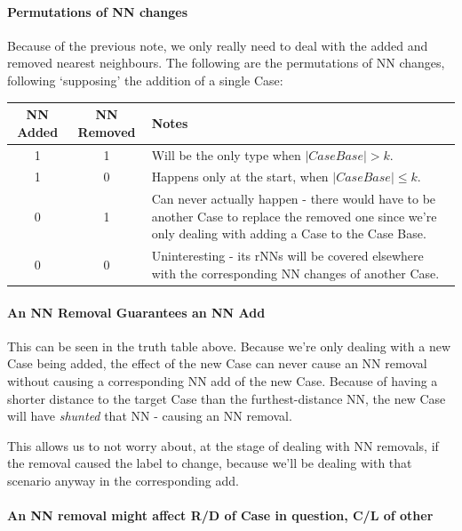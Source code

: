 \documentclass[a4paper,11pt]{report}
\begin{document}
\begin{samepage}
\paragraph{Permutations of NN changes}
Because of the previous note, we only really need to deal with the added and removed nearest neighbours. The following are the permutations of NN changes, following `supposing' the addition of a single Case:

\vspace{10pt}

\begin{tabular}{ | c | c | p{280pt} |} \hline
	NN Added & NN Removed & Notes \\ \hline
	1 & 1 & Will be the only type when $\left|CaseBase\right|> k$. \\ \hline
	1 & 0 & Happens only at the start, when $\left|CaseBase\right|\leq k$. \\ \hline
	0 & 1 & Can never actually happen - there would have to be another Case to replace the removed one since we're only dealing with adding a Case to the Case Base. \\ \hline
	0 & 0 & Uninteresting - its rNNs will be covered elsewhere with the corresponding NN changes of another Case. \\ \hline
\end{tabular}

\end{samepage}

\paragraph{An NN Removal Guarantees an NN Add}
This can be seen in the truth table above. Because we're only dealing with a new Case being added, the effect of the new Case can never cause an NN removal without causing a corresponding NN add of the new Case. Because of having a shorter distance to the target Case than the furthest-distance NN, the new Case will have \emph{shunted} that NN - causing an NN removal.

This allows us to not worry about, at the stage of dealing with NN removals, if the removal caused the label to change, because we'll be dealing with that scenario anyway in the corresponding add.

\paragraph{An NN removal might affect R/D of Case in question, C/L of other}
\end{document}
